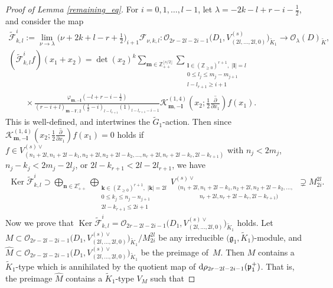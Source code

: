 \documentclass[pdftex]{sigma}
\numberwithin{equation}{section}
\newcommand{\bk}{\mathbf{k}}
\newcommand{\bl}{\mathbf{l}}
\newcommand{\bm}{\mathbf{m}}
\newcommand{\bn}{\mathbf{n}}
\newcommand{\BZ}{\mathbb{Z}}
\newcommand{\fg}{\mathfrak{g}}
\newcommand{\fp}{\mathfrak{p}}
\newcommand{\cF}{\mathcal{F}}
\newcommand{\cK}{\mathcal{K}}
\newcommand{\cO}{\mathcal{O}}
\begin{document}
\begin{proof}[Proof of Lemma \ref{remaining_eq}] For $i=0,1,\ldots,l-1$, let $\lambda=-2k-l+r-i-\frac{1}{2}$, and consider the map
\begin{gather*}
\tilde{\cF}_{k,l}^i:=\lim_{\nu\to\lambda}\big(\nu+2k+l-r+\tfrac{1}{2}\big)_{i+1}
\cF_{\nu,k,l}\colon \cO_{2r-2l-2i-1}\big(D_1,V_{(2l,\dots,2l,0)}^{(s)}\big)_{\tilde{K}_1}\to \cO_\lambda(D)_{\tilde{K}}, \\
(\tilde{\cF}_{k,l}^if)(x_1+x_2)=\det(x_2)^k\sum_{\bm\in\BZ_{++}^{\lfloor s/2\rfloor}}
\sum_{\substack{\bl\in(\BZ_{\ge 0})^{r+1},\; |\bl|=l\\ 0\le l_j\le m_j-m_{j+1}\\ l-l_{r+1}\ge i+1}}\\
\qquad{}\times\frac{\varphi_{\bm,-\bl}\left(-l+r-i-\frac{1}{2}\right)}{\left(r-i+l\right)_{\bm-\bl',2}
\left(\frac{1}{2}-i\right)_{l-l_{r+1}}(1)_{l-l_{r+1}-i-1}}
\cK_{\bm,-\bl}^{(1,4)}\left(x_2;\frac{1}{2}\overline{\frac{\partial}{\partial x_1}}\right)f(x_1).
\end{gather*}
This is well-defined, and intertwines the $\tilde{G}_1$-action. Then since
$\cK_{\bm,-\bl}^{(1,4)}\left(x_2;\frac{1}{2}\overline{\frac{\partial}{\partial x_1}}\right)f(x_1)=0$ holds if
$f\in V_{(n_1+2l,n_1+2l-k_1,n_2+2l,n_2+2l-k_2,\ldots,n_r+2l,n_r+2l-k_r,2l-k_{r+1})}^{(s)\vee}$
with $n_j<2m_j$, $n_j-k_j<2m_j-2l_j$, or $2l-k_{r+1}<2l-2l_{r+1}$, we have
\begin{gather*}
\operatorname{Ker}\tilde{\cF}_{k,l}^i \supset \bigoplus_{\bn\in\BZ_{++}^r}
\bigoplus_{\substack{\bk\in(\BZ_{\ge 0})^{r+1},\; |\bk|=2l\\ 0\le k_j\le n_j-n_{j+1}\\ 2l-k_{r+1}\le 2i+1}}
V_{\substack{(n_1+2l,n_1+2l-k_1,n_2+2l,n_2+2l-k_2,\ldots,\;\\
\hspace{45pt}n_r+2l,n_r+2l-k_r,2l-k_{r+1})}}^{(s)\vee} \supsetneq M_{2i}^{2l}.
\end{gather*}
Now we prove that $\operatorname{Ker}\tilde{\cF}_{k,l}^i=\cO_{2r-2l-2i-1}\big(D_1,V_{(2l,\dots,2l,0)}^{(s)\vee}\big)_{\tilde{K}_1}$ holds. Let $M\subset\cO_{2r-2l-2i-1}\big(D_1,\allowbreak V_{(2l,\dots,2l,0)}^{(s)\vee}\big)_{\tilde{K}_1}/M_{2i}^{2l}$ be any irreducible $\big(\fg_1,\tilde{K}_1\big)$-module, and $\hat{M}\subset \cO_{2r-2l-2i-1}\big(D_1,V_{(2l,\dots,2l,0)}^{(s)\vee}\big)_{\tilde{K}_1}$ be the preimage of~$M$. Then $M$ contains a $\tilde{K}_1$-type which is annihilated by the quotient map of ${\rm d}\rho_{2r-2l-2i-1}(\fp^+_1)$. That is, the preimage $\hat{M}$ contains a $\tilde{K}_1$-type $V_M$ such that

\end{proof}
\end{document}
